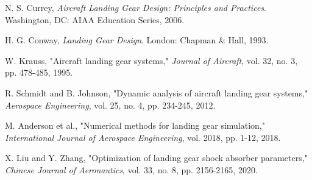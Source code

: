 \documentclass[journal]{IEEEtran}
\begin{document}
\begin{thebibliography}{00}
 N. S. Currey, \emph{Aircraft Landing Gear Design: Principles and Practices}. Washington, DC: AIAA Education Series, 2006.

 H. G. Conway, \emph{Landing Gear Design}. London: Chapman \& Hall, 1993.

 W. Krauss, "Aircraft landing gear systems," \emph{Journal of Aircraft}, vol. 32, no. 3, pp. 478-485, 1995.

 R. Schmidt and B. Johnson, "Dynamic analysis of aircraft landing gear systems," \emph{Aerospace Engineering}, vol. 25, no. 4, pp. 234-245, 2012.

 M. Anderson et al., "Numerical methods for landing gear simulation," \emph{International Journal of Aerospace Engineering}, vol. 2018, pp. 1-12, 2018.

 X. Liu and Y. Zhang, "Optimization of landing gear shock absorber parameters," \emph{Chinese Journal of Aeronautics}, vol. 33, no. 8, pp. 2156-2165, 2020.
\end{thebibliography}
\end{document}

